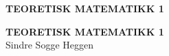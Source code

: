 



\pagestyle{empty}
\phantom{}
\vspace{50pt}
\begin{center}
	\textbf{TEORETISK MATEMATIKK 1}
\end{center}
 


\newpage
\phantom{text}
\newpage	
\phantom{text}
\vspace{2cm}
\begin{center}
	\textbf{TEORETISK MATEMATIKK 1} \\ 
	\vspace{5cm}
	Sindre Sogge Heggen
\end{center}
\newpage



